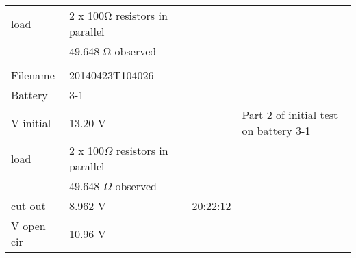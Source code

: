 \begin{longtable}{|l|l|l|p{2.5cm}|}
load       & 2 x 100Ω resistors in parallel &          &                                                                               \\
           & 49.648 Ω observed              &          &                                                                               \\
           &                                &          &                                                                               \\
\hline
Filename   & 20140423T104026                &          &                                                                               \\
Battery    & 3-1                            &          &                                                                               \\
V initial  & 13.20 V                        &          & Part 2 of initial test on battery 3-1                                         \\
load       & 2 x 100$\Omega$ resistors in parallel &          &                                                                               \\
           & 49.648 $\Omega$ observed              &          &                                                                               \\
cut out    & 8.962 V                        & 20:22:12 &                                                                               \\
V open cir & 10.96 V                        &          &           \\
\hline       
                                                   
\end{longtable}
